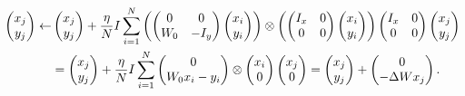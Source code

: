 \documentclass{article}
\theoremstyle{plain}
\theoremstyle{definition}
\theoremstyle{remark}
\begin{document}
\begin{align}
\left(\begin{array}{@{}c@{}}
  x_j\\
  y_j 
\end{array}\right)
  \leftarrow & \left(\begin{array}{@{}c@{}}
  x_j\\
  y_j 
\end{array}\right)
+ \frac{\eta}{N}I \sum_{i=1}^N
\left(\left(\begin{array}{@{}c c@{}}
  0
  & 0 \\
  W_0 &
  -I_y
\end{array}\right)
\left(\begin{array}{@{}c@{}}
  x_i\\
  y_i 
\end{array}\right)\right)
 \otimes\left(
\left(\begin{array}{@{}c c@{}}
  I_x
  & 0 \\
  0 &
  0
\end{array}\right)\left(\begin{array}{@{}c@{}}
  x_i\\
  y_i 
\end{array}\right)\right)
\left(\begin{array}{@{}c c@{}}
  I_x
  & 0 \\
  0 &
  0
\end{array}\right)
\left(\begin{array}{@{}c@{}}
  x_j\\
  y_j 
\end{array}\right)
 \nonumber\\
 \label{eq:trans_update}
&= \left(\begin{array}{@{}c@{}}
  x_j\\
  y_j 
\end{array}\right)
+ \frac{\eta}{N}I \sum_{i=1}^N
\left(\begin{array}{@{}c@{}}
  0\\
W_0 x_i - y_i 
\end{array}\right)
 \otimes\left(\begin{array}{@{}c@{}}
  x_i\\
   0
\end{array}\right)
\left(\begin{array}{@{}c@{}}
  x_j\\
  0
\end{array}\right) = \left(\begin{array}{@{}c@{}}
  x_j\\
  y_j 
\end{array}\right) + \left(\begin{array}{@{}c@{}}
  0\\
  -\Delta W x_j 
\end{array}\right).
\end{align}
\end{document}
